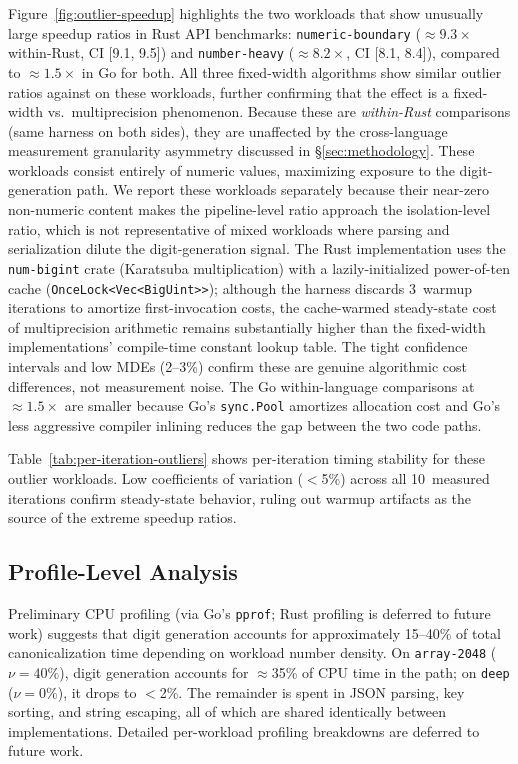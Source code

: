 Figure~\ref{fig:outlier-speedup} highlights the two workloads that show unusually large speedup ratios in Rust API
benchmarks: \texttt{numeric-boundary} (${\approx}9.3\times$ within-Rust,
CI [9.1, 9.5]) and \texttt{number-heavy} (${\approx}8.2\times$,
CI [8.1, 8.4]), compared to ${\approx}1.5\times$ in Go for both.
All three fixed-width algorithms show similar outlier ratios against
\burgerdybvig on these workloads, further confirming that the effect
is a fixed-width vs.\ multiprecision phenomenon.
Because these are \emph{within-Rust} comparisons (same harness on both
sides), they are unaffected by the cross-language measurement granularity
asymmetry discussed in \S\ref{sec:methodology}.  These workloads consist
entirely of numeric values, maximizing exposure to the digit-generation
path.  We report these workloads separately because their near-zero
non-numeric content makes the pipeline-level ratio approach the
isolation-level ratio, which is not representative of mixed workloads
where parsing and serialization dilute the digit-generation signal.  The Rust \burgerdybvig implementation uses the \texttt{num-bigint}
crate (Karatsuba multiplication) with a lazily-initialized
power-of-ten cache (\texttt{OnceLock<Vec<BigUint>>}); although the
harness discards 3~warmup iterations to amortize first-invocation
costs, the cache-warmed steady-state cost of
multiprecision arithmetic remains
substantially higher than the fixed-width implementations'
compile-time constant lookup table.  The tight confidence intervals
and low MDEs (2--3\%) confirm these are genuine algorithmic
cost differences, not measurement noise.  The Go within-language
comparisons at ${\approx}1.5\times$ are smaller because Go's
\texttt{sync.Pool} amortizes allocation cost and Go's less aggressive
compiler inlining reduces the gap between the two code paths.

Table~\ref{tab:per-iteration-outliers} shows per-iteration timing
stability for these outlier workloads.  Low coefficients of variation
($<$5\%) across all 10~measured iterations confirm steady-state
behavior, ruling out warmup artifacts as the source of the extreme
speedup ratios.



\subsection{Profile-Level Analysis}

Preliminary CPU profiling (via Go's \texttt{pprof}; Rust profiling is
deferred to future work) suggests that digit
generation accounts for approximately 15--40\% of total canonicalization
time depending on workload number density.  On \texttt{array-2048}
($\nu = 40\%$), digit generation accounts for $\approx$35\% of CPU time
in the \burgerdybvig path; on \texttt{deep} ($\nu = 0\%$), it drops to
$<$2\%.  The remainder is spent in JSON parsing, key sorting, and string
escaping, all of which are shared identically between implementations.  Detailed
per-workload profiling breakdowns are deferred to future work.

